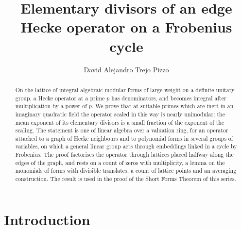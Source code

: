 \documentclass[10pt]{amsart}
\theoremstyle{definition}
\theoremstyle{remark}
\begin{document}
\addtolength{\abovedisplayskip}{-3.4pt}
\addtolength{\belowdisplayskip}{-3.4pt}
\addtolength{\belowdisplayshortskip}{-2pt}
\title[Elementary divisors of an edge Hecke operator]{Elementary divisors of an edge Hecke operator on a Frobenius cycle}
\author{David Alejandro Trejo Pizzo}
\date{}
\begin{abstract}
On the lattice of integral algebraic modular forms of large weight on a definite unitary group,
a Hecke operator at a prime $p$ has denominators, and becomes integral after multiplication by a
power of $p$. We prove that at suitable primes which are inert in an imaginary quadratic field the
operator scaled in this way is nearly unimodular: the mean exponent of its elementary divisors is
a small fraction of the exponent of the scaling. The statement is one of linear algebra over a
valuation ring, for an operator attached to a graph of Hecke neighbours and to polynomial forms
in several groups of variables, on which a general linear group acts through embeddings linked in
a cycle by Frobenius. The proof factorises the operator through lattices placed halfway along the
edges of the graph, and rests on a count of zeros with multiplicity, a lemma on the monomials of
forms with divisible translates, a count of lattice points and an averaging construction. The
result is used in the proof of the Short Forms Theorem of this series.
\end{abstract}
\maketitle
\setcounter{tocdepth}{1}\tableofcontents

\section{Introduction}\label{A2:intro}
\end{document}
